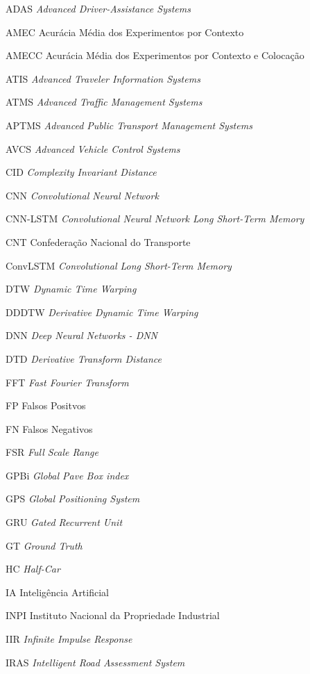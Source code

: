\begin{siglas}
\item[ADAS] \textit{Advanced Driver-Assistance Systems}
\item[AMEC] Acurácia Média dos Experimentos por Contexto
\item[AMECC] Acurácia Média dos Experimentos por Contexto e Colocação
\item[ATIS] \textit{Advanced Traveler Information Systems}
\item[ATMS] \textit{Advanced Traffic Management Systems}
\item[APTMS] \textit{Advanced Public Transport Management Systems}
\item[AVCS] \textit{Advanced Vehicle Control Systems}
\item[CID] \textit{Complexity Invariant Distance}
\item[CNN] \textit{Convolutional Neural Network}
\item[CNN-LSTM] \textit{Convolutional Neural Network Long Short-Term Memory}
\item[CNT] Confederação Nacional do Transporte
\item[ConvLSTM] \textit{Convolutional Long Short-Term Memory}
\item[DTW] \textit{Dynamic Time Warping}
\item[DDDTW] \textit{Derivative Dynamic Time Warping}
\item[DNN] \textit{Deep Neural Networks - DNN}
\item[DTD] \textit{Derivative Transform Distance}
\item[FFT] \textit{Fast Fourier Transform}
\item[FP] Falsos Positvos
\item[FN] Falsos Negativos
\item[FSR] \textit{Full Scale Range}
\item[GPBi] \textit{Global Pave Box index}
\item[GPS] \textit{Global Positioning System}
\item[GRU] \textit{Gated Recurrent Unit}
\item[GT] \textit{Ground Truth}
\item[HC] \textit{Half-Car}
\item[IA] Inteligência  Artificial
\item[INPI] Instituto Nacional da Propriedade Industrial
\item[IIR] \textit{Infinite Impulse Response}
\item[IRAS] \textit{Intelligent Road Assessment System}

\end{siglas}
